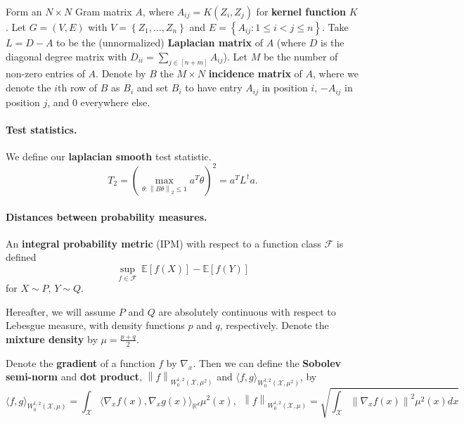 \documentclass{article}
\newcommand{\Reals}{\mathbb{R}}
\newcommand{\Expect}[1]{\mathbb{E}\left[ #1 \right]}
\newcommand{\norm}[1]{\left\lVert#1\right\rVert}
\newcommand{\dotp}[2]{\langle #1 , #2 \rangle}
\newcommand{\set}[1]{\left\{#1\right\}}
\newcommand{\Linv}{L^{\dagger}}
\newcommand{\F}{\mathcal{F}}
\newcommand{\X}{\mathcal{X}}
\newcommand{\Rd}{\Reals^d}
\theoremstyle{alden}
\theoremstyle{definition}
\theoremstyle{remark}
\begin{document}
Form an $N \times N$ Gram matrix $A$, where $A_{ij} = K(Z_i, Z_j)$ for \textbf{kernel function} $K$. Let $G = (V,E)$ with $V = \set{Z_1, \ldots, Z_n}$ and $E = \set{A_{ij}: 1 \leq i < j \leq n}$. Take $L = D - A$ to be the (unnormalized) \textbf{Laplacian matrix} of $A$ (where $D$ is the diagonal degree matrix with $D_{ii} = \sum_{j \in [n + m]} A_{ij}$). Let $M$ be the number of non-zero entries of $A$. Denote by $B$ the $M \times N$ \textbf{incidence matrix} of $A$, where we denote the $i$th row of $B$ as $B_i$ and set $B_i$ to have entry $A_{ij}$ in position $i$, $-A_{ij}$ in position $j$, and $0$ everywhere else. 

\paragraph{Test statistics.}

We define our \textbf{laplacian smooth} test statistic. 
\begin{equation*}
T_2 = \left(\max_{\theta: \norm{B\theta}_2 \leq 1} a^T \theta \right)^2 = a^T \Linv a. 
\end{equation*}

\paragraph{Distances between probability measures.}

An \textbf{integral probability metric} (IPM) with respect to a function class $\F$ is defined
\begin{equation*}
\underset{f \in \F}{\sup} ~ \Expect{f(X)} - \Expect{f(Y)}
\end{equation*}
for $X \sim P$, $Y \sim Q$. 

Hereafter, we will assume $P$ and $Q$ are absolutely continuous with respect to Lebesgue measure, with density functions $p$ and $q$, respectively. Denote the \textbf{mixture density} by $\mu = \frac{p + q}{2}$. 

Denote the \textbf{gradient} of a function $f$ by $\nabla_x$. Then we can define the \textbf{Sobolev semi-norm} and \textbf{dot product}, $\norm{f}_{W_0^{1,2}(\X, \mu^2)}$ and $\dotp{f}{g}_{W_0^{1,2}(\X, \mu^2)}$, by
\begin{equation*}
\dotp{f}{g}_{W_0^{1,2}(\X, \mu)} = \int_{\X} \dotp{\nabla_x f(x)}{\nabla_x g(x)}_{\Rd} \mu^2(x), ~~ \norm{f}_{W_0^{1,2}(\X, \mu)} = \sqrt{\int_{\X} \norm{\nabla_x f(x)}^2 \mu^2(x) dx }
\end{equation*}
\end{document}
